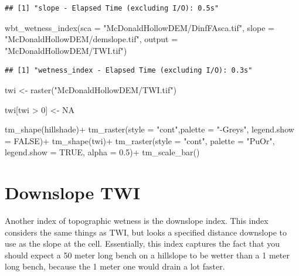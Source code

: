 \documentclass[
]{book}
\newenvironment{Shaded}{\begin{snugshade}}{\end{snugshade}}
\newcommand{\AttributeTok}[1]{\textcolor[rgb]{0.77,0.63,0.00}{#1}}
\newcommand{\ConstantTok}[1]{\textcolor[rgb]{0.00,0.00,0.00}{#1}}
\newcommand{\DecValTok}[1]{\textcolor[rgb]{0.00,0.00,0.81}{#1}}
\newcommand{\FloatTok}[1]{\textcolor[rgb]{0.00,0.00,0.81}{#1}}
\newcommand{\FunctionTok}[1]{\textcolor[rgb]{0.00,0.00,0.00}{#1}}
\newcommand{\NormalTok}[1]{#1}
\newcommand{\OtherTok}[1]{\textcolor[rgb]{0.56,0.35,0.01}{#1}}
\newcommand{\SpecialCharTok}[1]{\textcolor[rgb]{0.00,0.00,0.00}{#1}}
\newcommand{\StringTok}[1]{\textcolor[rgb]{0.31,0.60,0.02}{#1}}
\begin{document}
\begin{verbatim}
## [1] "slope - Elapsed Time (excluding I/O): 0.5s"
\end{verbatim}

\begin{Shaded}
\begin{Highlighting}[]
\FunctionTok{wbt\_wetness\_index}\NormalTok{(}\AttributeTok{sca =} \StringTok{"McDonaldHollowDEM/DinfFAsca.tif"}\NormalTok{,}
                  \AttributeTok{slope =} \StringTok{"McDonaldHollowDEM/demslope.tif"}\NormalTok{,}
                  \AttributeTok{output =} \StringTok{"McDonaldHollowDEM/TWI.tif"}\NormalTok{)}
\end{Highlighting}
\end{Shaded}

\begin{verbatim}
## [1] "wetness_index - Elapsed Time (excluding I/O): 0.3s"
\end{verbatim}

\begin{Shaded}
\begin{Highlighting}[]
\NormalTok{twi }\OtherTok{\textless{}{-}} \FunctionTok{raster}\NormalTok{(}\StringTok{"McDonaldHollowDEM/TWI.tif"}\NormalTok{)}

\NormalTok{twi[twi }\SpecialCharTok{\textgreater{}} \DecValTok{0}\NormalTok{] }\OtherTok{\textless{}{-}} \ConstantTok{NA}

\FunctionTok{tm\_shape}\NormalTok{(hillshade)}\SpecialCharTok{+}
  \FunctionTok{tm\_raster}\NormalTok{(}\AttributeTok{style =} \StringTok{"cont"}\NormalTok{,}\AttributeTok{palette =} \StringTok{"{-}Greys"}\NormalTok{, }\AttributeTok{legend.show =} \ConstantTok{FALSE}\NormalTok{)}\SpecialCharTok{+}
\FunctionTok{tm\_shape}\NormalTok{(twi)}\SpecialCharTok{+}
  \FunctionTok{tm\_raster}\NormalTok{(}\AttributeTok{style =} \StringTok{"cont"}\NormalTok{, }\AttributeTok{palette =} \StringTok{"PuOr"}\NormalTok{, }\AttributeTok{legend.show =} \ConstantTok{TRUE}\NormalTok{, }\AttributeTok{alpha =} \FloatTok{0.5}\NormalTok{)}\SpecialCharTok{+}
  \FunctionTok{tm\_scale\_bar}\NormalTok{()}
\end{Highlighting}
\end{Shaded}

\hypertarget{downslope-twi}{%
\section{Downslope TWI}\label{downslope-twi}}

Another index of topographic wetness is the downslope index. This index considers the same things as TWI, but looks a specified distance downslope to use as the slope at the cell. Essentially, this index captures the fact that you should expect a 50 meter long bench on a hillslope to be wetter than a 1 meter long bench, because the 1 meter one would drain a lot faster.
\end{document}
